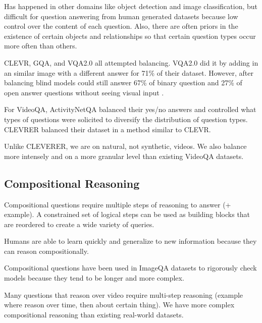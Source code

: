 \documentclass[10pt,twocolumn,letterpaper]{article}
\newcommand{\mgm}[1]{{\color{cyan}{mgm: #1}}}
\begin{document}
Has happened in other domains like object detection and image classification, but difficult for question answering from human generated datasets because low control over the content of each question. Also, there are often priors in the existence of certain objects and relationships so that certain question types occur more often than others. 

CLEVR, GQA, and VQA2.0 all attempted balancing. VQA2.0 did it by adding in an similar image with a different answer for 71\% of their dataset. However, after balancing blind models could still answer 67\% of binary question and 27\% of open answer questions without seeing visual input \mgm{our binary is better, but our open is about the same}. 

For VideoQA, ActivityNetQA balanced their yes/no answers and controlled what types of questions were solicited to diversify the distribution of question types. CLEVRER balanced their dataset in a method similar to CLEVR.

Unlike CLEVERER, we are on natural, not synthetic, videos. We also balance more intensely and on a more granular level than existing VideoQA datasets.

\subsection{Compositional Reasoning}

Compositional questions require multiple steps of reasoning to answer (+ example). A constrained set of logical steps can be used as building blocks that are reordered to create a wide variety of queries. 

Humans are able to learn quickly and generalize to new information because they can reason compositionally. 

Compositional questions have been used in ImageQA datasets to rigorously check models because they tend to be longer and more complex. 

Many questions that reason over video require multi-step reasoning (example where reason over time, then about certain thing). We have more complex compositional reasoning than existing real-world datasets.
\end{document}
